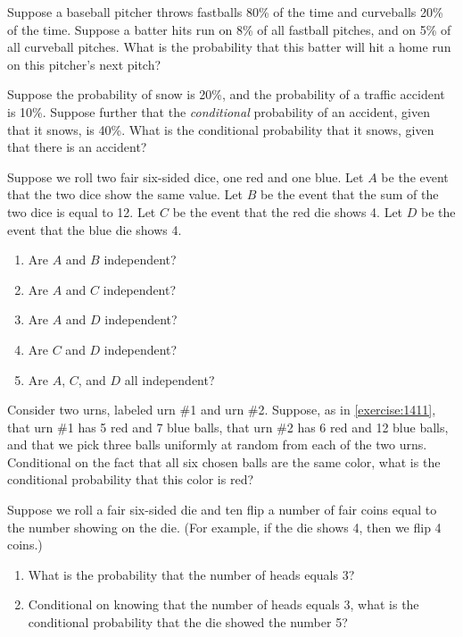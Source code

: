 \begin{exercises}
    \item Suppose a baseball pitcher throws fastballs 80\% of the time and curveballs 20\% of the time. Suppose a batter hits run on 8\% of all fastball pitches, and on 5\% of all curveball pitches. What is the probability that this batter will hit a home run on this pitcher's next pitch?
    \item Suppose the probability of snow is 20\%, and the probability of a traffic accident is 10\%. Suppose further that the \emph{conditional} probability of an accident, given that it snows, is 40\%. What is the conditional probability that it snows, given that there is an accident?
    \item Suppose we roll two fair six-sided dice, one red and one blue. Let $A$ be the event that the two dice show the same value. Let $B$ be the event that the sum of the two dice is equal to 12. Let $C$ be the event that the red die shows 4. Let $D$ be the event that the blue die shows 4.
        \begin{enumerate}
            \item Are $A$ and $B$ independent?
            \item Are $A$ and $C$ independent?
            \item Are $A$ and $D$ independent?
            \item Are $C$ and $D$ independent?
            \item Are $A$, $C$, and $D$ all independent?
        \end{enumerate}
    \item Consider two urns, labeled urn \#1 and urn \#2. Suppose, as in \autoref{exercise:1411}, that urn \#1 has 5 red and 7 blue balls, that urn \#2 has 6 red and 12 blue balls, and that we pick three balls uniformly at random from each of the two urns. Conditional on the fact that all six chosen balls are the same  color, what is the conditional probability that this color is red?
    \item Suppose we roll a fair six-sided die and ten flip a number of fair coins equal to the number showing on the die. (For example, if the die shows 4, then we flip 4 coins.)
        \begin{enumerate}
            \item What is the probability that the number of heads equals 3?
            \item Conditional on knowing that the number of heads equals 3, what is the conditional probability that the die showed the  number 5?
        \end{enumerate}

\end{exercises}
